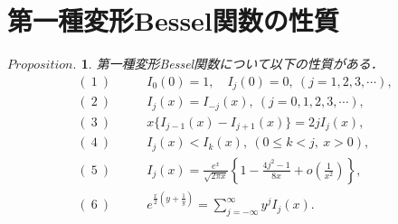 \documentclass[a4j,papersize,disablejfam,slide,14pt]{jsarticle}
\newtheorem{Prop}{$Proposition.$}
\def\exp#1{e^{#1}} %
\begin{document}
\section{第一種変形{\rm Bessel}関数の性質}
\label{sec:appendix_bessel_property}
	\begin{screen}
		\begin{Prop}
    		第一種変形{\rm Bessel}関数について以下の性質がある．
        	\begin{align}
        		(\ 1\ ) &\qquad I_0(0) = 1,\quad I_j(0) = 0,\ (j = 1,2,3,\cdots), \\
            	(\ 2\ ) &\qquad I_j(x) = I_{-j}(x),\ (j = 0,1,2,3,\cdots), \\
            	(\ 3\ ) &\qquad x\{I_{j-1}(x) - I_{j+1}(x)\} = 2jI_j(x), \\
            	(\ 4\ ) &\qquad I_j(x) < I_k(x),\ (0 \leq k < j,\ x > 0), \\
            	(\ 5\ ) &\qquad I_j(x) = \frac{\exp{x}}{\sqrt{2 \pi x}} \left\{ 1-\frac{4j^2 - 1}{8x} + o\left( \frac{1}{x^2} \right) \right\}, \\
                (\ 6\ ) &\qquad \exp{\frac{x}{2}\left(y + \frac{1}{y}\right)} = \sum_{j=-\infty}^{\infty} y^jI_j(x). 
        	\end{align}
    	\end{Prop}
    \end{screen}
\end{document}

